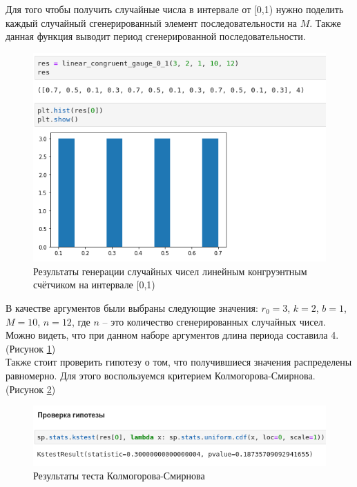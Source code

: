 \documentclass[14pt,fleqn]{extarticle}
\begin{document}
	\newpage
    Для того чтобы получить случайные числа в интервале от [0,1) нужно поделить каждый случайный сгенерированный элемент последовательности на $M$. Также данная функция выводит период сгенерированной последовательности.
    \begin{figure}[h]
        \centering \includegraphics[scale=0.6]{linear_congruent_gauge_0_1_result}
        \caption{Результаты генерации случайных чисел линейным конгруэнтным счётчиком на интервале [0,1)}
        \label{fig:linear_congruent_gauge_0_1_result}
    \end{figure}

    В качестве аргументов были выбраны следующие значения: $r_0 = 3$, $k = 2$, $b = 1$, $M = 10$, $n = 12$, где $n$ -- это количество сгенерированных случайных чисел. Можно видеть, что при данном наборе аргументов длина периода составила 4. (Рисунок \ref{fig:linear_congruent_gauge_0_1_result})\\
    
   	Также стоит проверить гипотезу о том, что получившиеся значения распределены равномерно. Для этого воспользуемся критерием Колмогорова-Смирнова. (Рисунок \ref{fig:linear_congruent_gauge_0_1_test})
    \begin{figure}[h]
    	\centering \includegraphics[scale=0.6]{linear_congruent_gauge_0_1_test}
    	\caption{Результаты теста Колмогорова-Смирнова}
    	\label{fig:linear_congruent_gauge_0_1_test}
    \end{figure}
    
\end{document}
